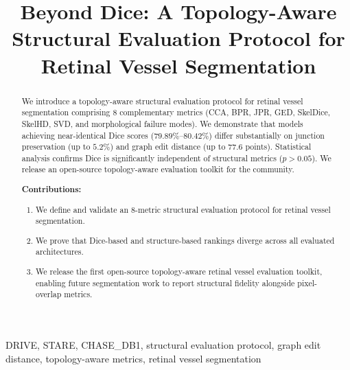 \documentclass[conference]{IEEEtran}
\begin{document}
\title{Beyond Dice: A Topology-Aware Structural Evaluation Protocol for Retinal Vessel Segmentation}

\author{
}

\maketitle

\begin{abstract}
We introduce a topology-aware structural evaluation protocol for retinal vessel segmentation comprising 8 complementary metrics (CCA, BPR, JPR, GED, SkelDice, SkelHD, SVD, and morphological failure modes). We demonstrate that models achieving near-identical Dice scores ($79.89\%$--$80.42\%$) differ substantially on junction preservation (up to $5.2\%$) and graph edit distance (up to $77.6$ points). Statistical analysis confirms Dice is significantly independent of structural metrics ($p > 0.05$). We release an open-source topology-aware evaluation toolkit for the community.

\textbf{Contributions:}
\begin{enumerate}
    \item We define and validate an 8-metric structural evaluation protocol for retinal vessel segmentation.
    \item We prove that Dice-based and structure-based rankings diverge across all evaluated architectures.
    \item We release the first open-source topology-aware retinal vessel evaluation toolkit, enabling future segmentation work to report structural fidelity alongside pixel-overlap metrics.
\end{enumerate}
\end{abstract}

\begin{IEEEkeywords}
DRIVE, STARE, CHASE\_DB1, structural evaluation protocol, graph edit distance, topology-aware metrics, retinal vessel segmentation
\end{IEEEkeywords}
\end{document}
